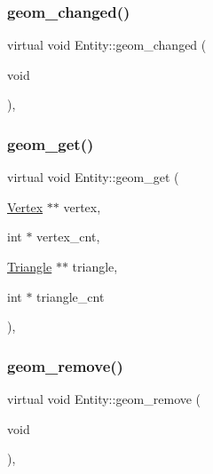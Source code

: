\mbox{\label{classEntity_a6a98dc8aef878f984b942d6b8a57e968}} 
\subsubsection{\texorpdfstring{geom\+\_\+changed()}{geom\_changed()}}
{\footnotesize\ttfamily virtual void Entity\+::geom\+\_\+changed (\begin{DoxyParamCaption}\item[{void}]{ }\end{DoxyParamCaption})\hspace{0.3cm}{\ttfamily [protected]}, {\ttfamily [virtual]}}

\mbox{\label{classEntity_a35b3384cb4aba28b3e2129d332499445}} 
\subsubsection{\texorpdfstring{geom\+\_\+get()}{geom\_get()}}
{\footnotesize\ttfamily virtual void Entity\+::geom\+\_\+get (\begin{DoxyParamCaption}\item[{\mbox{\hyperlink{classVertex}{Vertex}} $\ast$$\ast$}]{vertex,  }\item[{int $\ast$}]{vertex\+\_\+cnt,  }\item[{\mbox{\hyperlink{classTriangle}{Triangle}} $\ast$$\ast$}]{triangle,  }\item[{int $\ast$}]{triangle\+\_\+cnt }\end{DoxyParamCaption})\hspace{0.3cm}{\ttfamily [protected]}, {\ttfamily [virtual]}}

\mbox{\label{classEntity_a078d35f6eac032312bf9aa1d5f8614c1}} 
\subsubsection{\texorpdfstring{geom\+\_\+remove()}{geom\_remove()}}
{\footnotesize\ttfamily virtual void Entity\+::geom\+\_\+remove (\begin{DoxyParamCaption}\item[{void}]{ }\end{DoxyParamCaption})\hspace{0.3cm}{\ttfamily [protected]}, {\ttfamily [virtual]}}

